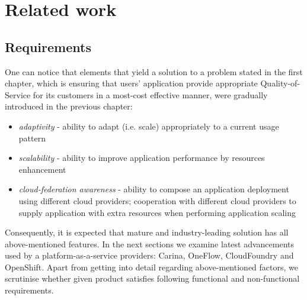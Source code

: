 \section{Related work} 


\subsection{Requirements}
One can notice that elements that yield a solution to a problem stated in the first chapter, which is ensuring that users' application provide appropriate Quality-of-Service for its customers in a most-cost effective manner, were gradually introduced in the previous chapter:

\begin{itemize}
	\item \emph{adaptivity} - ability to adapt (i.e. scale) appropriately to a current usage pattern
	\item \emph{scalability} - ability to improve application performance by resources enhancement
	\item \emph{cloud-federation awareness} - ability to compose an application deployment using different cloud providers; cooperation with different cloud providers to supply application with extra resources when performing application scaling
\end{itemize}

Consequently, it is expected that mature and industry-leading solution has all above-mentioned features. In the next sections we examine latest advancements used by a platform-as-a-service providers: Carina, OneFlow, CloudFoundry and OpenShift. Apart from getting into detail regarding above-mentioned factors, we scrutinise whether given product satisfies following functional and non-functional requirements. 

